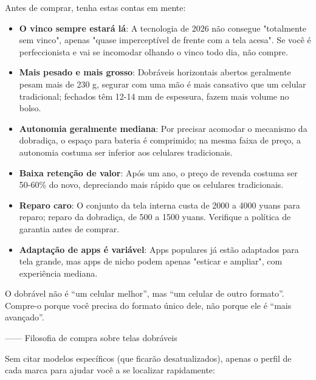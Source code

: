 
Antes de comprar, tenha estas contas em mente:

\begin{itemize}
  \item \textbf{O vinco sempre estará lá}: A tecnologia de 2026 não consegue "totalmente sem vinco", apenas "quase imperceptível de frente com a tela acesa". Se você é perfeccionista e vai se incomodar olhando o vinco todo dia, não compre.
  \item \textbf{Mais pesado e mais grosso}: Dobráveis horizontais abertos geralmente pesam mais de 230 g, segurar com uma mão é mais cansativo que um celular tradicional; fechados têm 12-14 mm de espessura, fazem mais volume no bolso.
  \item \textbf{Autonomia geralmente mediana}: Por precisar acomodar o mecanismo da dobradiça, o espaço para bateria é comprimido; na mesma faixa de preço, a autonomia costuma ser inferior aos celulares tradicionais.
  \item \textbf{Baixa retenção de valor}: Após um ano, o preço de revenda costuma ser 50-60\% do novo, depreciando mais rápido que os celulares tradicionais.
  \item \textbf{Reparo caro}: O conjunto da tela interna custa de 2000 a 4000 yuans para reparo; reparo da dobradiça, de 500 a 1500 yuans. Verifique a política de garantia antes de comprar.
  \item \textbf{Adaptação de apps é variável}: Apps populares já estão adaptados para tela grande, mas apps de nicho podem apenas "esticar e ampliar", com experiência mediana.
\end{itemize}

O dobrável não é “um celular melhor”, mas “um celular de outro formato”. Compre-o porque você precisa do formato único dele, não porque ele é “mais avançado”.

—— Filosofia de compra sobre telas dobráveis


Sem citar modelos específicos (que ficarão desatualizados), apenas o perfil de cada marca para ajudar você a se localizar rapidamente:

